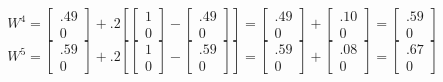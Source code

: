 \documentclass[fontsize=11bp, paper=a4]{scrarticle}
\begin{document}
$$
W^4 = \begin{bmatrix} .49 \\ 0 \end{bmatrix} + .2[\begin{bmatrix} 1 \\ 0 \end{bmatrix} - \begin{bmatrix} .49 \\ 0 \end{bmatrix}] = \begin{bmatrix} .49 \\ 0 \end{bmatrix} + \begin{bmatrix} .10 \\ 0 \end{bmatrix} = \begin{bmatrix} .59 \\ 0 \end{bmatrix}
$$
$$
W^5 = \begin{bmatrix} .59 \\ 0 \end{bmatrix} + .2[\begin{bmatrix} 1 \\ 0 \end{bmatrix} - \begin{bmatrix} .59 \\ 0 \end{bmatrix}] = \begin{bmatrix} .59 \\ 0 \end{bmatrix} + \begin{bmatrix} .08 \\ 0 \end{bmatrix} = \begin{bmatrix} .67 \\ 0 \end{bmatrix}
$$
\end{document}
